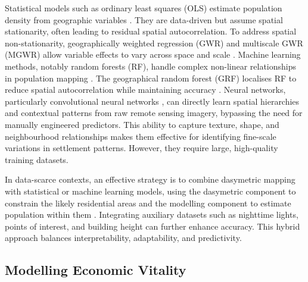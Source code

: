\documentclass[
  12pt,
  oneside]{book}
\begin{document}
Statistical models such as ordinary least squares (OLS) estimate population density from geographic variables \autocite{baganAnalysisUrbanGrowth2015}. They are data-driven but assume spatial stationarity, often leading to residual spatial autocorrelation. To address spatial non-stationarity, geographically weighted regression (GWR) and multiscale GWR (MGWR) allow variable effects to vary across space and scale \autocite{leiImprovedPopulationMapping2024}. Machine learning methods, notably random forests (RF), handle complex non-linear relationships in population mapping \autocite{stevensDisaggregatingCensusData2015,liRandomForestBasedMethod2018}. The geographical random forest (GRF) localises RF to reduce spatial autocorrelation while maintaining accuracy \autocite{georganosCensusHeavenUnraveling2022}. Neural networks, particularly convolutional neural networks \autocite{gervasoniConvolutionalNeuralNetworks2018}, can directly learn spatial hierarchies and contextual patterns from raw remote sensing imagery, bypassing the need for manually engineered predictors. This ability to capture texture, shape, and neighbourhood relationships makes them effective for identifying fine-scale variations in settlement patterns. However, they require large, high-quality training datasets.

In data-scarce contexts, an effective strategy is to combine dasymetric mapping with statistical or machine learning models, using the dasymetric component to constrain the likely residential areas and the modelling component to estimate population within them \autocite{pajaresPopulationDisaggregationBuilding2021,sapenaEmpiricRecommendationsPopulation2022}. Integrating auxiliary datasets such as nighttime lights, points of interest, and building height can further enhance accuracy. This hybrid approach balances interpretability, adaptability, and predictivity.

\subsection{Modelling Economic Vitality}\label{modelling-economic-vitality}
\end{document}
